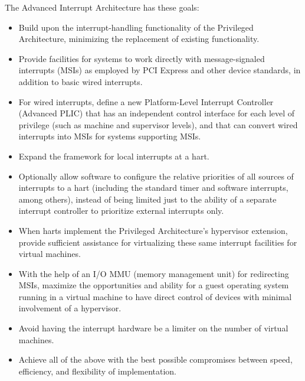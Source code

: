 The {\RISCV} Advanced Interrupt Architecture has these goals:
\begin{itemize}

\item
Build upon the interrupt-handling functionality of the {\RISCV}
Privileged Architecture, minimizing the replacement of existing
functionality.

\item
Provide facilities for {\RISCV} systems to work directly with
message-signaled interrupts (MSIs) as employed by PCI Express and other
device standards, in addition to basic wired interrupts.

\item
For wired interrupts, define a new Platform-Level Interrupt Controller
(Advanced PLIC) that has an independent control interface for each
level of privilege (such as {\RISCV} machine and supervisor levels),
and that can convert wired interrupts into MSIs for systems supporting
MSIs.

\item
Expand the framework for local interrupts at a {\RISCV} hart.

\item
Optionally allow software to configure the relative priorities of all
sources of interrupts to a {\RISCV} hart (including the standard timer
and software interrupts, among others), instead of being limited
just to the ability of a separate interrupt controller to prioritize
external interrupts only.

\item
When harts implement the Privileged Architecture's hypervisor
extension, provide sufficient assistance for virtualizing these same
interrupt facilities for virtual machines.

\item
With the help of an I/O MMU (memory management unit) for redirecting
MSIs, maximize the opportunities and ability for a guest operating
system running in a virtual machine to have direct control of devices
with minimal involvement of a hypervisor.

\item
Avoid having the interrupt hardware be a limiter on the number of
virtual machines.

\item
Achieve all of the above with the best possible compromises between
speed, efficiency, and flexibility of implementation.

\end{itemize}

